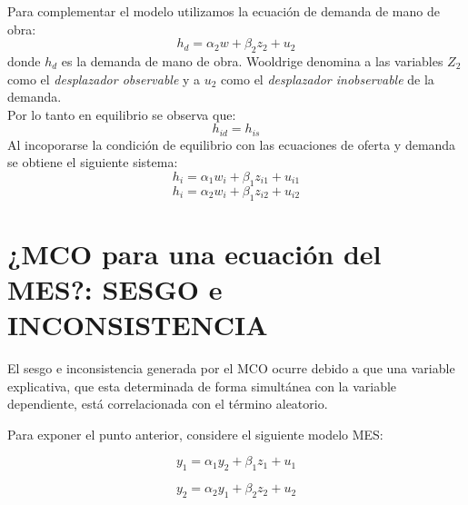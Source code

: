 \documentclass[a4paper,11pt]{book}
\begin{document}
Para complementar el modelo utilizamos la ecuación de demanda de mano de obra:
\begin{equation}\label{eq:mhs}
h_{d} = \alpha_{2}w + \beta_{2}z_{2} + u_{2}
\end{equation}
donde  $h_{d}$ es la demanda de mano de obra. Wooldrige denomina a las variables $Z_{2}$ como el \textit{desplazador observable} y a $u_{2}$ como el \textit{desplazador inobservable} de la demanda.\\

Por lo tanto en equilibrio se observa que:
\begin{equation}\label{eq:equi}
h_{id} = h_{is} 
\end{equation}
Al incoporarse la condición de equilibrio con las ecuaciones de oferta y demanda se obtiene el siguiente sistema:
\begin{equation}\label{eq:mhs2}
h_{i} = \alpha_{1}w_{i} + \beta_{1}z_{i1} + u_{i1}
\end{equation}
\begin{equation}\label{eq:mhw2}
h_{i} = \alpha_{2}w_{i} + \beta_{1}z_{i2} + u_{i2}
\end{equation}

\section{¿MCO para una ecuación del MES?: SESGO e INCONSISTENCIA}

El sesgo e inconsistencia generada por el MCO ocurre debido a que una variable explicativa, que esta determinada de forma simultánea con la variable dependiente, está correlacionada con el término aleatorio.

Para exponer el punto anterior, considere el siguiente modelo MES:

\begin{equation}
y_{1} = \alpha_{1}y_{2} + \beta_{1}z_{1} + u_{1}
\end{equation}

\begin{equation}
y_{2} = \alpha_{2}y_{1} + \beta_{2}z_{2} + u_{2}
\end{equation}
\end{document}
